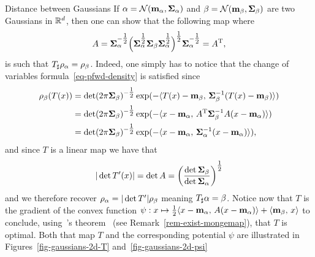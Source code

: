 \begin{rem2}{Distance between Gaussians}\label{rem-dist-gaussians}
If $\alpha = \mathcal{N}(\mathbf{m}_\alpha,\mathbf{\Sigma}_\alpha)$ and $\beta = \mathcal{N}(\mathbf{m}_\beta,\mathbf{\Sigma}_\beta)$ are two Gaussians in $\mathbb{R}^d$, then one can show that the following map
where
$$A=\mathbf{\Sigma}_\alpha^{-\tfrac{1}{2}}\Big(\mathbf{\Sigma}_\alpha^{\tfrac{1}{2}}\mathbf{\Sigma}_\beta\mathbf{\Sigma}_\alpha^{\tfrac{1}{2}}\Big)^{\tfrac{1}{2}}\mathbf{\Sigma}_\alpha^{-\tfrac{1}{2}}={A}^{\mathrm{T}},$$
is such that $T_\sharp \rho_\alpha = \rho_\beta$. Indeed, one simply has to notice that the change of variables formula~\eqref{eq-pfwd-density} is satisfied since
$$
\begin{aligned}\rho_\beta(T(x))&=\det(2\pi\mathbf{\Sigma}_\beta)^{-\tfrac{1}{2}} \exp(-\langle T(x)-\mathbf{m}_\beta,\,\mathbf{\Sigma}_\beta^{-1}(T(x)-\mathbf{m}_\beta)\rangle)\\
&= \det(2\pi\mathbf{\Sigma}_\beta)^{-\tfrac{1}{2}} \exp(-\langle  x-\mathbf{m}_\alpha,\,{A}^{\mathrm{T}}\mathbf{\Sigma}_\beta^{-1}A(x-\mathbf{m}_\alpha)\rangle) \\
&= \det(2\pi\mathbf{\Sigma}_\beta)^{-\tfrac{1}{2}} \exp(-\langle  x-\mathbf{m}_\alpha,\,\mathbf{\Sigma}_\alpha^{-1}(x-\mathbf{m}_\alpha)\rangle),
\end{aligned}$$
and since $T$ is a linear map we have that
$$|\det T'(x)|= \det A = \left(\frac{\det\mathbf{\Sigma}_\beta}{\det\mathbf{\Sigma}_\alpha}\right)^{\tfrac{1}{2}}$$
 and we therefore recover $\rho_\alpha=|\det T'| \rho_\beta$ meaning $T_\sharp \alpha = \beta$. Notice now that $T$ is the gradient of the convex function $\psi:x\mapsto \tfrac{1}{2}\langle x-\mathbf{m}_\alpha,\,A (x-\mathbf{m}_\alpha)\rangle + \langle \mathbf{m}_\beta,\,x\rangle$ to conclude, using~\citeauthor{Brenier91}'s theorem~\citeyearpar{Brenier91} (see Remark~\ref{rem-exist-mongemap}), that $T$ is optimal. Both that map $T$ and the corresponding potential $\psi$ are illustrated in Figures~\ref{fig-gaussians-2d-T} and~\ref{fig-gaussians-2d-psi}


\end{rem2}
